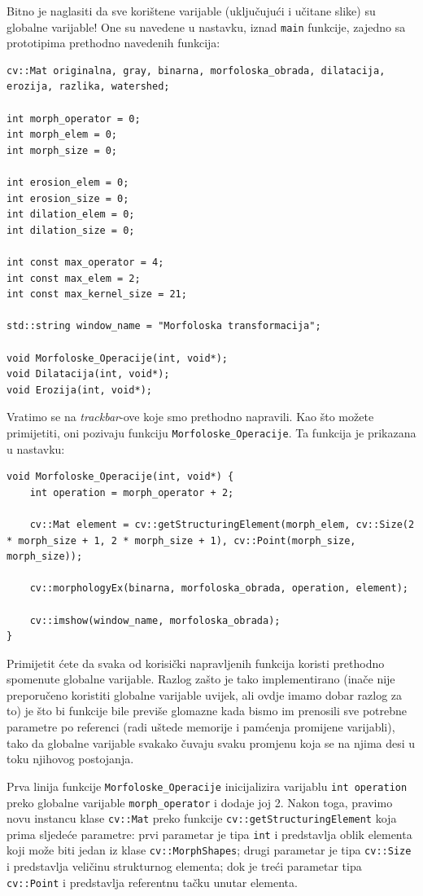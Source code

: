 \documentclass[a4paper, 12pt]{article}
\begin{document}
Bitno je naglasiti da sve korištene varijable (uključujući i učitane slike) su globalne varijable! One su navedene u nastavku, iznad \lstinline{main} funkcije, zajedno sa prototipima prethodno navedenih funkcija:

\begin{lstlisting}
cv::Mat originalna, gray, binarna, morfoloska_obrada, dilatacija, erozija, razlika, watershed;

int morph_operator = 0;
int morph_elem = 0;
int morph_size = 0;

int erosion_elem = 0;
int erosion_size = 0;
int dilation_elem = 0;
int dilation_size = 0;

int const max_operator = 4;
int const max_elem = 2;
int const max_kernel_size = 21;

std::string window_name = "Morfoloska transformacija";

void Morfoloske_Operacije(int, void*);
void Dilatacija(int, void*);
void Erozija(int, void*);
\end{lstlisting}

Vratimo se na \textit{trackbar}-ove koje smo prethodno napravili. Kao što možete primijetiti, oni pozivaju funkciju \lstinline{Morfoloske_Operacije}. Ta funkcija je prikazana u nastavku:

\begin{lstlisting}
void Morfoloske_Operacije(int, void*) {
    int operation = morph_operator + 2;

    cv::Mat element = cv::getStructuringElement(morph_elem, cv::Size(2 * morph_size + 1, 2 * morph_size + 1), cv::Point(morph_size, morph_size));

    cv::morphologyEx(binarna, morfoloska_obrada, operation, element);

    cv::imshow(window_name, morfoloska_obrada);
}
\end{lstlisting}

Primijetit ćete da svaka od korisički napravljenih funkcija koristi prethodno spomenute globalne varijable. Razlog zašto je tako implementirano (inače nije preporučeno koristiti globalne varijable uvijek, ali ovdje imamo dobar razlog za to) je što bi funkcije bile previše glomazne kada bismo im prenosili sve potrebne parametre po referenci (radi uštede memorije i pamćenja promijene varijabli), tako da globalne varijable svakako čuvaju svaku promjenu koja se na njima desi u toku njihovog postojanja.

Prva linija funkcije \lstinline{Morfoloske_Operacije} inicijalizira varijablu \lstinline{int operation} preko globalne varijable \lstinline{morph_operator} i dodaje joj 2. Nakon toga, pravimo novu instancu klase \lstinline{cv::Mat} preko funkcije \lstinline{cv::getStructuringElement} koja prima sljedeće parametre: prvi parametar je tipa \lstinline{int} i predstavlja oblik elementa koji može biti jedan iz klase \lstinline{cv::MorphShapes}; drugi parametar je tipa \lstinline{cv::Size} i predstavlja veličinu strukturnog elementa; dok je treći parametar tipa \lstinline{cv::Point} i predstavlja referentnu tačku unutar elementa.
\end{document}
